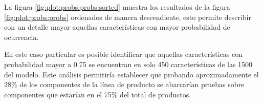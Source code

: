 La figura \ref{fig:plot:probs:probs:sorted} muestra
los resultados de la figura \ref{fig:plot:probs:probs}
ordenados de manera descendiente, esto permite describir con
un detalle mayor aquellas características con mayor 
probabilidad de ocurrencia.

En este caso particular es posible identificar
que aquellas características con probabilidad mayor
a 0.75 se encuentran en solo 450 características
de las 1500 del modelo. Este análisis permitiría
establecer que probando aproximadamente el 28\% de
los componentes de la línea de producto se abarcarían
pruebas sobre componentes que estarían en el 75\%
del total de productos.






 




